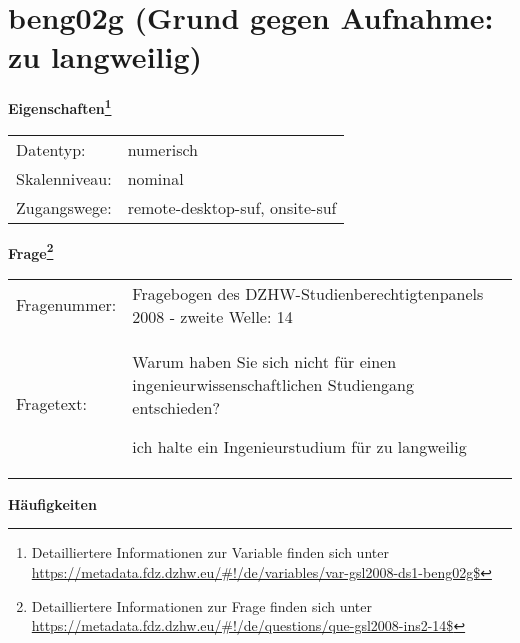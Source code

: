 
    \setcounter{footnote}{0}

    \vspace*{-1.8cm}
	\section{beng02g (Grund gegen Aufnahme: zu langweilig)}
	\label{section:beng02g}



    \vspace*{0.5cm}
    \noindent\textbf{Eigenschaften\footnote{Detailliertere Informationen zur Variable finden sich unter
		\url{https://metadata.fdz.dzhw.eu/\#!/de/variables/var-gsl2008-ds1-beng02g$}}}\\
	\begin{tabularx}{\hsize}{@{}lX}
	Datentyp: & numerisch \\
	Skalenniveau: & nominal \\
	Zugangswege: &
	  remote-desktop-suf, 
	  onsite-suf
 \\
    \end{tabularx}



				\vspace*{0.5cm}
                \noindent\textbf{Frage\footnote{Detailliertere Informationen zur Frage finden sich unter
		              \url{https://metadata.fdz.dzhw.eu/\#!/de/questions/que-gsl2008-ins2-14$}}}\\
				\begin{tabularx}{\hsize}{@{}lX}
					Fragenummer: &
					  Fragebogen des DZHW-Studienberechtigtenpanels 2008 - zweite Welle:
					  14
 \\
					Fragetext: & Warum haben Sie sich nicht für einen ingenieurwissenschaftlichen Studiengang entschieden?\par  ich halte ein Ingenieurstudium für zu langweilig \\
				\end{tabularx}





        		\vspace*{0.5cm}
                \noindent\textbf{Häufigkeiten}

